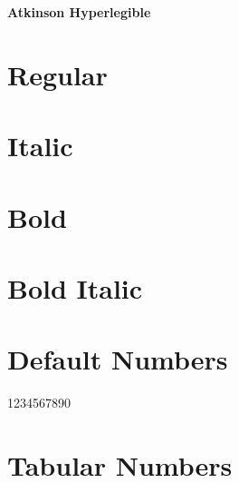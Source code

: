 \documentclass{article}
\begin{document}
\begin{center}\huge\bf Atkinson Hyperlegible
\end{center}


\section*{Regular}
\lipsum[1]

\section*{Italic}
\textit{\lipsum[2]}

\section*{Bold}

\textbf{\lipsum[3]}

\section*{Bold Italic}

\textbf{\textit{\lipsum[4]}}

\section*{Default Numbers}

1234567890

\section*{Tabular Numbers}

\end{document}
